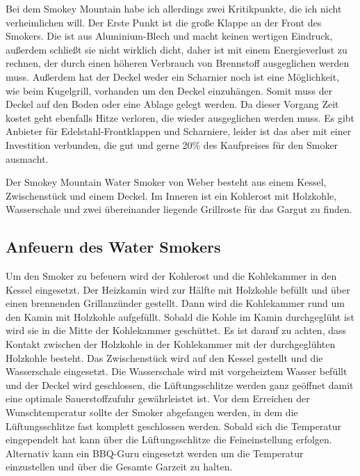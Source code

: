 	Bei dem Smokey Mountain habe ich allerdings zwei Kritikpunkte, die ich nicht 
	verheimlichen will. Der Erste Punkt ist die große 
	Klappe an der Front des Smokers. 
	Die ist aus Aluminium-Blech und macht keinen wertigen Eindruck, außerdem 
	schließt sie nicht wirklich dicht, daher ist mit 
	einem Energieverlust zu rechnen, der 
	durch einen höheren Verbrauch von Brennstoff ausgeglichen werden muss. 
	Außerdem hat der Deckel weder ein Scharnier 
	noch ist eine Möglichkeit, wie beim 
	Kugelgrill, vorhanden um den Deckel
	einzuhängen. Somit muss der Deckel auf den Boden oder eine Ablage gelegt 
	werden. Da dieser Vorgang Zeit kostet geht 
	ebenfalls Hitze verloren, die wieder 
	ausgeglichen werden muss.
	Es gibt Anbieter für Edelstahl-Frontklappen und Scharniere, leider ist das aber 
	mit einer Investition verbunden, die gut und 
	gerne 20\% des Kaufpreises für den 
	Smoker ausmacht.
	
	Der Smokey Mountain Water Smoker von Weber besteht aus einem Kessel, 
	Zwischenstück und einem Deckel. Im Inneren ist 
	ein Kohlerost mit Holzkohle, 
	Wasserschale und zwei übereinander liegende Grillroste für das Gargut zu 
	finden.

\subsection{Anfeuern des Water Smokers}

	Um den Smoker zu befeuern wird der Kohlerost und die Kohlekammer in den 
	Kessel eingesetzt. Der Heizkamin wird zur 
	Hälfte mit Holzkohle befüllt und über 
	einen brennenden Grillanzünder gestellt. Dann wird die Kohlekammer rund um 
	den Kamin mit Holzkohle aufgefüllt. Sobald die 
	Kohle im Kamin durchgeglüht ist 
	wird sie in die Mitte der Kohlekammer geschüttet. Es ist darauf zu achten, dass 
	Kontakt zwischen der Holzkohle in der 
	Kohlekammer mit der durchgeglühten 
	Holzkohle besteht. Das Zwischenstück wird auf den Kessel gestellt und die 
	Wasserschale eingesetzt. Die Wasserschale wird 
	mit vorgeheiztem Wasser befüllt 
	und der Deckel wird geschlossen, die Lüftungsschlitze werden ganz geöffnet 
	damit eine optimale Sauerstoffzufuhr 
	gewährleistet ist. Vor dem Erreichen der 
	Wunschtemperatur sollte der Smoker abgefangen werden, in dem die 
	Lüftungsschlitze fast komplett geschlossen werden. 
	Sobald sich die Temperatur 
	eingependelt hat kann über die Lüftungsschlitze die Feineinstellung erfolgen. 
	Alternativ kann ein BBQ-Guru eingesetzt 
	werden um die Temperatur einzustellen 
	und über die Gesamte Garzeit zu halten.